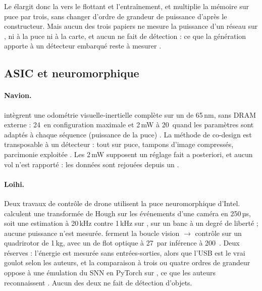 Le  élargit donc la  vers le flottant et l'entraînement, et multiplie la
mémoire sur puce par trois, sans changer d'ordre de grandeur de puissance d'après le
constructeur. Mais aucun des trois papiers ne mesure la puissance d'un réseau sur , ni
à la puce ni à la carte, et aucun ne fait de détection : ce que la génération  apporte
à un détecteur embarqué reste à mesurer \deduit.

\subsection{ASIC et neuromorphique}

\paragraph{Navion.} \citet{2019-suleiman-navion-2-mw-fully-integrated} intègrent une
odométrie visuelle-inertielle complète sur un  de 65\,nm, sans DRAM externe : 24\, en
configuration maximale et 2\,mW à 20\, quand les paramètres sont adaptés à chaque
séquence (puissance de la puce) \med. La méthode de co-design est
transposable à un détecteur : tout sur puce, tampons d'image compressés, parcimonie
exploitée \deduit. Les 2\,mW supposent un réglage fait a posteriori, et aucun vol n'est
rapporté : les données sont rejouées depuis un  .

\paragraph{Loihi.} Deux travaux de contrôle de drone utilisent la puce neuromorphique 
d'Intel. \citet{arxiv-2108.03694-event-driven-vision-control-uavs}\pp{} calculent une
transformée de Hough sur les événements d'une caméra  en 250\,µs, soit une estimation à
20\,kHz contre 1\,kHz sur , sur un banc à un degré de liberté \med ;
aucune puissance n'est mesurée. \citet{arxiv-2303.08778-fully-neuromorphic-vision-control-autonomous}\pp{}
ferment la boucle vision $\rightarrow$ contrôle sur un quadrirotor de 1\,kg, avec un  de
flot optique à 27\, par inférence à 200\, . Deux réserves : l'énergie
est mesurée sans entrées-sorties, alors que l'USB est le vrai goulot selon les auteurs, et
la comparaison à trois ou quatre ordres de grandeur oppose  à une émulation du SNN en
PyTorch sur , ce que les auteurs reconnaissent . Aucun des deux
ne fait de détection d'objets.

